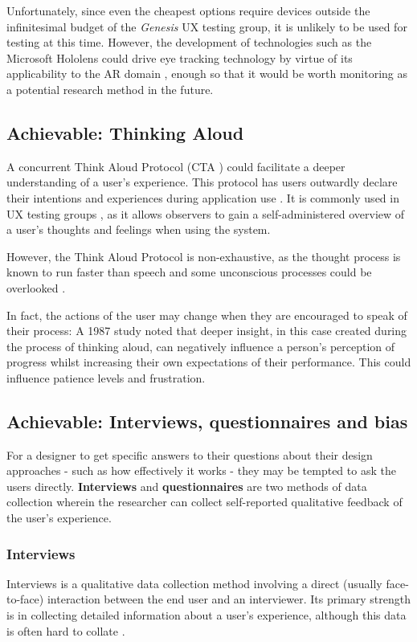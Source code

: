 \documentclass{scrartcl}
\begin{document}
Unfortunately, since even the cheapest options require devices outside the infinitesimal budget of the \textit{Genesis} UX testing group, it is unlikely to be used for testing at this time. However, the development of technologies such as the Microsoft Hololens could drive eye tracking technology by virtue of its applicability to the AR domain \cite{cognolato_head-mounted_2018} \cite{majaranta_chapter_2014}, enough so that it would be worth monitoring as a potential research method in the future.

\subsection{Achievable: Thinking Aloud}
A concurrent Think Aloud Protocol (CTA \cite{cooke_assessing_2010}) could facilitate a deeper understanding of a user's experience. This protocol has users outwardly declare their intentions and experiences during application use \cite{haak_exploring_2003} \cite{cooke_assessing_2010}. It is commonly used in UX testing groups \cite{mcdonald_exploring_2012}, as it allows observers to gain a self-administered overview of a user's thoughts and feelings when using the system.

However, the Think Aloud Protocol is non-exhaustive, as the thought process is known to run faster than speech \cite{e._fonteyn_description_1993} and some unconscious processes could be overlooked \cite{cooke_assessing_2010}.

In fact, the actions of the user may change when they are encouraged to speak of their process: A 1987 study \cite{metcalfe_intuition_1987} noted that deeper insight, in this case created during the process of thinking aloud, can negatively influence a person's perception of progress whilst increasing their own expectations of their performance. This could influence patience levels and frustration.

\subsection{Achievable: Interviews, questionnaires and bias}
For a designer to get specific answers to their questions about their design approaches - such as how effectively it works - they may be tempted to ask the users directly. \textbf{Interviews} and \textbf{questionnaires} are two methods of data collection wherein the researcher can collect self-reported qualitative feedback of the user's experience.

\subsubsection{Interviews}
Interviews is a qualitative data collection method involving a direct (usually face-to-face) interaction between the end user and an interviewer. Its primary strength is in collecting detailed information about a user's experience, although this data is often hard to collate \cite{wilson_interview_2013} \cite{dumay_qualitative_2011}.
\end{document}
